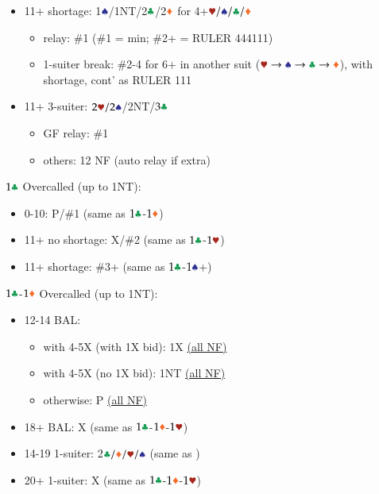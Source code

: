 \documentclass{article}
\begin{document}
\begin{multicols}{2}
\begin{CJK*}{UTF8}{gt}
\begin{itemize}
\begin{itemize}
    \end{itemize}
    \item 11+ shortage: 1$\sss$/1NT/2$\ccc$/2$\ddd$ 
    for 4+$\hhh/\sss/\ccc/\ddd$
    \begin{itemize}
        \item relay: \#1 (\#1 = min; \#2+ = RULER 444111)
        \item 1-suiter break: \#2-4 for 6+ in another suit ($\hscd$), with shortage, cont' as RULER 111
    \end{itemize}
    \item 11+ 3-suiter: $2\hhh/2\sss$/2NT/$3\ccc$
    \begin{itemize}
        \item GF relay: \#1
        \item others: 12 NF (auto relay if extra)
    \end{itemize}
\end{itemize}\vspace{2em}

\noindent $1\ccc$ Overcalled (up to 1NT):
\begin{itemize}
    \item 0-10: P/\#1 (same as $1\ccc$-$1\ddd$)
    \item 11+ no shortage: X/\#2 (same as $1\ccc$-$1\hhh$)
    \item 11+ shortage: \#3+ (same as $1\ccc$-$1\sss$+)
\end{itemize}\vspace{2em}

\noindent $1\ccc$-$1\ddd$ Overcalled (up to 1NT):
\begin{itemize}
    \item 12-14 BAL:
    \begin{itemize}
        \item with 4-5X (with 1X bid): 1X \hyperref[sec:1c1d-nf]{(all NF)}
        \item with 4-5X (no 1X bid): 1NT \hyperref[sec:1c1d-nf]{(all NF)}
        \item otherwise: P \hyperref[sec:1c1d-nf]{(all NF)}
    \end{itemize}
    \item 18+ BAL: X (same as $1\ccc$-$1\ddd$-$1\hhh$)
    \item 14-19 1-suiter: 2$\ccc/\ddd/\hhh/\sss$ (same as )
    \item 20+ 1-suiter: X (same as $1\ccc$-$1\ddd$-$1\hhh$)
\end{itemize}


\end{CJK*}
\end{multicols}
\end{document}
